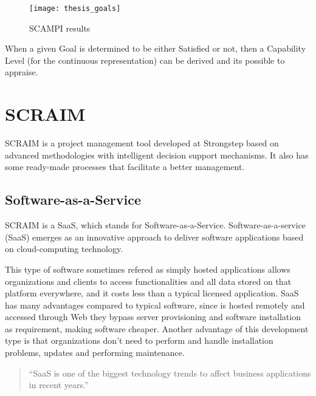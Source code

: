 \begin{figure}[h]
	\begin{center}
		\leavevmode
		\texttt{[image: thesis\_goals]}
		\caption{SCAMPI results}
		\label{fig:scampiresults}
	\end{center}
\end{figure}


When a given Goal is determined to be either Satisfied or not, then a Capability Level (for the continuous representation) can be derived and its possible to appraise.

\section{SCRAIM}

SCRAIM \citep{SCRAIM} is a project management tool developed at Strongstep based on advanced methodologies with intelligent decision support mechanisms. It also has some ready-made processes that facilitate a better management.

\subsection{Software-as-a-Service}

SCRAIM is a SaaS, which stands for Software-as-a-Service. Software-as-a-service (SaaS) emerges as an innovative
approach to deliver software applications based on cloud-computing
technology. \citep{Chou:2007:ANI:1359479.1359484}

This type of software sometimes refered as simply hosted applications allows organizations and clients to access functionalities and all data stored on that platform everywhere, and it costs less than a typical licensed application. SaaS has many advantages compared to typical software, since is hosted remotely and accessed through Web they bypass server provisioning and software
installation as requirement, making software cheaper. Another advantage of this development type is that organizations don't need to perform and handle installation problems, updates and performing maintenance.

\begin{quote}
	``SaaS is one of the biggest technology trends to affect business
	applications in recent years.''~\cite{House2009}
\end{quote}

